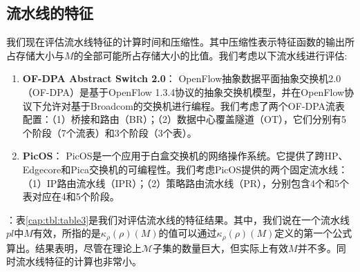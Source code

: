 \subsection{流水线的特征}

我们现在评估流水线特征的计算时间和压缩性。其中压缩性表示特征函数的输出所占存储大小与$M$的全部可能所占存储大小的比值。我们考虑以下流水线进行评估:


\begin{enumerate}
  \item \textbf{OF-DPA Abstract Switch 2.0}： OpenFlow抽象数据平面抽象交换机2.0（OF-DPA）是基于OpenFlow 1.3.4协议的抽象交换机模型，并在OpenFlow协议下允许对基于Broadcom的交换机进行编程。我们考虑了两个OF-DPA流表配置：（1）桥接和路由（BR）；（2）数据中心覆盖隧道（OT），它们分别有5个阶段（7个流表）和3个阶段（3个表）。\cite{OF-DPA}

  \item \textbf{PicOS}： PicOS是一个应用于白盒交换机的网络操作系统。它提供了跨HP、Edgecore和Pica交换机的可编程性。我们考虑PicOS提供的两个固定流水线：（1）IP路由流水线（IPR）；（2）策略路由流水线（PR），分别包含4个和5个表对应在4和5个阶段。\cite{PicOS}
\end{enumerate}

：表\ref{cap:tbl:table3}是我们对评估流水线的特征结果。其中，我们说在一个流水线$pl$中$M$有效，所指的是$\kappa_\rho(\rho)(M)$的值可以通过$\kappa_\rho(\rho)(M)$定义的第一个公式算出。结果表明，尽管在理论上$\mathcal{M}$子集的数量巨大，但实际上有效$M$并不多。同时流水线特征的计算也非常小。



